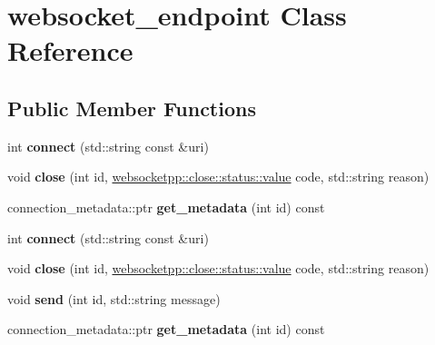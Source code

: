 \hypertarget{classwebsocket__endpoint}{}\section{websocket\+\_\+endpoint Class Reference}
\label{classwebsocket__endpoint}
\subsection*{Public Member Functions}
\begin{DoxyCompactItemize}
\item 
\mbox{\label{classwebsocket__endpoint_a5850523b829e145793d42e137d5eb8c0}} 
int {\bfseries connect} (std\+::string const \&uri)
\item 
\mbox{\label{classwebsocket__endpoint_ac18bcc30c3894c74c9ad028b47c299f9}} 
void {\bfseries close} (int id, \mbox{\hyperlink{namespacewebsocketpp_1_1close_1_1status_a8614a5c4733d708e2d2a32191c5bef84}{websocketpp\+::close\+::status\+::value}} code, std\+::string reason)
\item 
\mbox{\label{classwebsocket__endpoint_a5896c27213953d2d33b88e117b1971f6}} 
connection\+\_\+metadata\+::ptr {\bfseries get\+\_\+metadata} (int id) const
\item 
\mbox{\label{classwebsocket__endpoint_a5850523b829e145793d42e137d5eb8c0}} 
int {\bfseries connect} (std\+::string const \&uri)
\item 
\mbox{\label{classwebsocket__endpoint_ac18bcc30c3894c74c9ad028b47c299f9}} 
void {\bfseries close} (int id, \mbox{\hyperlink{namespacewebsocketpp_1_1close_1_1status_a8614a5c4733d708e2d2a32191c5bef84}{websocketpp\+::close\+::status\+::value}} code, std\+::string reason)
\item 
\mbox{\label{classwebsocket__endpoint_aaae3d15cae0c3d7fd134ca28676e53cc}} 
void {\bfseries send} (int id, std\+::string message)
\item 
\mbox{\label{classwebsocket__endpoint_a5896c27213953d2d33b88e117b1971f6}} 
connection\+\_\+metadata\+::ptr {\bfseries get\+\_\+metadata} (int id) const

\end{DoxyCompactItemize}
